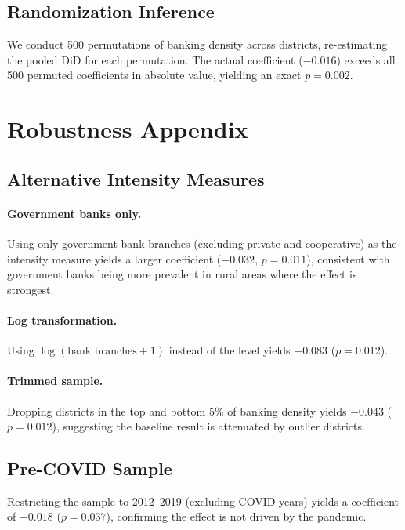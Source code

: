 \documentclass[12pt]{article}
\begin{document}
\subsection{Randomization Inference}

We conduct 500 permutations of banking density across districts, re-estimating the pooled DiD for each permutation. The actual coefficient ($-0.016$) exceeds all 500 permuted coefficients in absolute value, yielding an exact $p = 0.002$.

\section{Robustness Appendix}\label{app:robustness}

\subsection{Alternative Intensity Measures}

\paragraph{Government banks only.} Using only government bank branches (excluding private and cooperative) as the intensity measure yields a larger coefficient ($-0.032$, $p = 0.011$), consistent with government banks being more prevalent in rural areas where the effect is strongest.

\paragraph{Log transformation.} Using $\log(\text{bank branches} + 1)$ instead of the level yields $-0.083$ ($p = 0.012$).

\paragraph{Trimmed sample.} Dropping districts in the top and bottom 5\% of banking density yields $-0.043$ ($p = 0.012$), suggesting the baseline result is attenuated by outlier districts.

\subsection{Pre-COVID Sample}

Restricting the sample to 2012--2019 (excluding COVID years) yields a coefficient of $-0.018$ ($p = 0.037$), confirming the effect is not driven by the pandemic.
\end{document}
